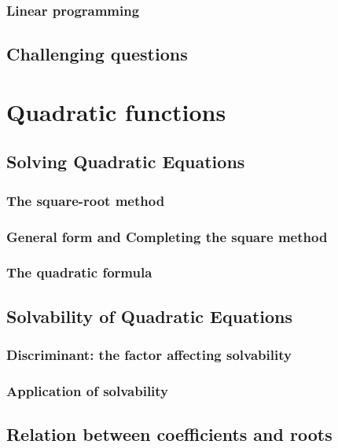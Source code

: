 \documentclass[12pt]{article}
\begin{document}
    \subsubsection{Linear programming}

    \subsection{Challenging questions}

    \newpage

    \section{Quadratic functions}

    \subsection{Solving Quadratic Equations}

    \subsubsection{The square-root method}

    \subsubsection{General form and Completing the square method}

    \subsubsection{The quadratic formula}

    \subsection{Solvability of Quadratic Equations}

    \subsubsection{Discriminant: the factor affecting solvability}

    \subsubsection{Application of solvability}

    \subsection{Relation between coefficients and roots}
\end{document}
